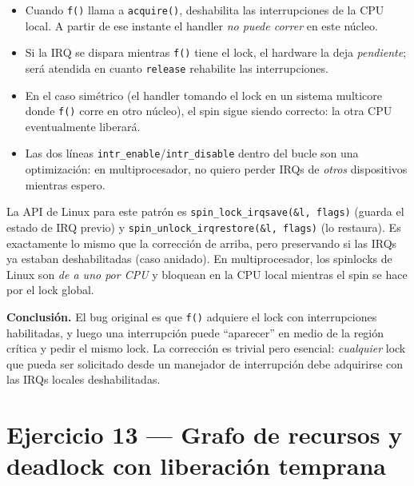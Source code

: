 \documentclass[11pt,a4paper]{article}
\begin{document}
\begin{itemize}[leftmargin=*]
    \item Cuando \texttt{f()} llama a \texttt{acquire()}, deshabilita
        las interrupciones de la CPU local. A partir de ese instante el
        handler \emph{no puede correr} en este núcleo.
    \item Si la IRQ se dispara mientras \texttt{f()} tiene el lock, el
        hardware la deja \emph{pendiente}; será atendida en cuanto
        \texttt{release} rehabilite las interrupciones.
    \item En el caso simétrico (el handler tomando el lock en un
        sistema multicore donde \texttt{f()} corre en otro núcleo), el
        spin sigue siendo correcto: la otra CPU eventualmente liberará.
    \item Las dos líneas \texttt{intr\_enable}/\texttt{intr\_disable}
        dentro del bucle son una optimización: en multiprocesador, no
        quiero perder IRQs de \emph{otros} dispositivos mientras espero.
\end{itemize}

\begin{ojo}
La API de Linux para este patrón es \texttt{spin\_lock\_irqsave(\&l,
flags)} (guarda el estado de IRQ previo) y
\texttt{spin\_unlock\_irqrestore(\&l, flags)} (lo restaura). Es exactamente
lo mismo que la corrección de arriba, pero preservando si las IRQs ya
estaban deshabilitadas (caso anidado). En multiprocesador, los spinlocks
de Linux son \emph{de a uno por CPU} y bloquean en la CPU local mientras
el spin se hace por el lock global.
\end{ojo}

\textbf{Conclusión.} El bug original es que \texttt{f()} adquiere el
lock con interrupciones habilitadas, y luego una interrupción puede
``aparecer'' en medio de la región crítica y pedir el mismo lock. La
corrección es trivial pero esencial: \emph{cualquier} lock que pueda
ser solicitado desde un manejador de interrupción debe adquirirse con
las IRQs locales deshabilitadas.

\section{Ejercicio 13 --- Grafo de recursos y deadlock con liberación temprana}
\end{document}
